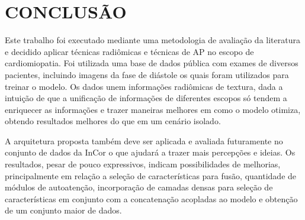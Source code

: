 \chapter{CONCLUSÃO}
\label{chap:consideracoes_parciais}

Este trabalho foi executado mediante uma metodologia de avaliação da literatura e decidido aplicar técnicas radiômicas e técnicas de \gls{AP} no escopo de cardiomiopatia. Foi utilizada uma base de dados pública com exames de diversos pacientes, incluindo imagens da fase de diástole os quais foram utilizados para treinar o modelo. Os dados unem informações radiômicas de textura, dada a intuição de que a unificação de informações de diferentes escopos só tendem a enriquecer as informações e trazer maneiras melhores em como o modelo otimiza, obtendo resultados melhores do que em um cenário isolado.

A arquitetura proposta também deve ser aplicada e avaliada futuramente no conjunto de dados da \gls{InCor} o que ajudará a trazer mais percepções e ideias. Os resultados, pesar de pouco expressivos, indicam possibilidades de melhorias, principalmente em relação a seleção de características para fusão, quantidade de módulos de autoatenção, incorporação de camadas densas para seleção de características em conjunto com a concatenação acopladas ao modelo e obtenção de um conjunto maior de dados. 